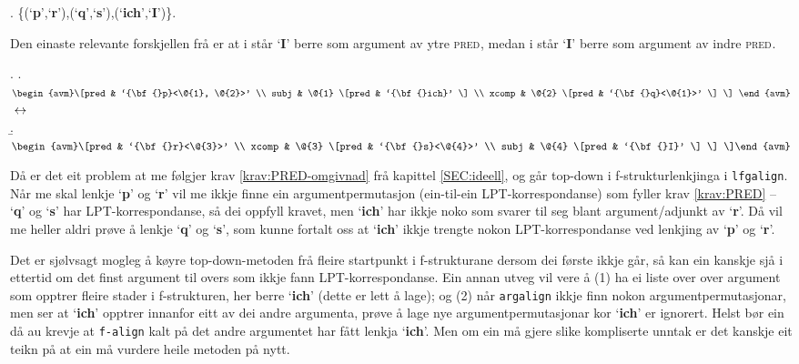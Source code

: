 \documentclass[12pt,a4paper,oneside,draft]{report}
\newcommand{\F}[2]{\textsc{#1}\ensuremath{_{#2}}}
\newcommand{\PRED}{\F{pred}{}}
\newcommand{\p}[1]{`\textbf{#1}'}
\begin{document}
\ex. \{(\p{p},\p{r}),(\p{q},\p{s}),(\p{ich},\p{I})\}.

Den einaste relevante forskjellen frå \LLast er at i \LLast står \p{I}
 berre som argument av ytre \PRED{}, medan i \Next står \p{I} berre
 som argument av indre \PRED{}.

{\avmoptions{}
\ex. \a. $\begin{avm}\[pred & `{\bf{}p}<\@{1}, \@{2}>'  \\
     subj & \@{1} \[pred &  `{\bf{}ich}' \] \\
     xcomp & \@{2} \[pred & `{\bf{}q}<\@{1}>' \] \] \end{avm}$
     $\\\\\leftrightarrow$\\
     \b. $\begin{avm}\[pred & `{\bf{}r}<\@{3}>' \\
     xcomp & \@{3} \[pred & `{\bf{}s}<\@{4}>' \\
     subj & \@{4} \[pred &  `{\bf{}I}' \] \] \]\end{avm}$

}

Då er det eit problem at me følgjer krav \ref{krav:PRED-omgivnad} frå
 kapittel \ref{SEC:ideell}, og går top-down i f-strukturlenkjinga i
 \texttt{lfgalign}. Når me skal lenkje \p{p} og \p{r} vil me ikkje finne ein
 argumentpermutasjon (ein-til-ein LPT-korrespondanse) som fyller krav
 \ref{krav:PRED} -- \p{q} og \p{s} har LPT-korrespondanse, så dei
 oppfyll kravet, men \p{ich} har ikkje noko som svarer til seg blant
 argument/adjunkt av \p{r}. Då vil me heller aldri prøve å lenkje
 \p{q} og \p{s}, som kunne fortalt oss at \p{ich} ikkje trengte nokon
 LPT-korrespondanse ved lenkjing av \p{p} og \p{r}.

Det er sjølvsagt mogleg å køyre top-down-metoden frå fleire startpunkt
 i f-strukturane dersom dei første ikkje går, så kan ein kanskje sjå i
 ettertid om det finst argument til overs som ikkje fann
 LPT-korrespondanse. Ein annan utveg vil vere å (1) ha ei liste over
 over argument som opptrer fleire stader i f-strukturen, her berre
 \p{ich} (dette er lett å lage); og (2) når \texttt{argalign} ikkje finn
 nokon argumentpermutasjonar, men ser at \p{ich} opptrer innanfor eitt
 av dei andre argumenta, prøve å lage nye argumentpermutasjonar kor
 \p{ich} er ignorert. Helst bør ein då au krevje at \texttt{f-align} kalt på
 det andre argumentet har fått lenkja \p{ich}.  Men om ein må gjere
 slike kompliserte unntak er det kanskje eit teikn på at ein må
 vurdere heile metoden på nytt.
\end{document}

